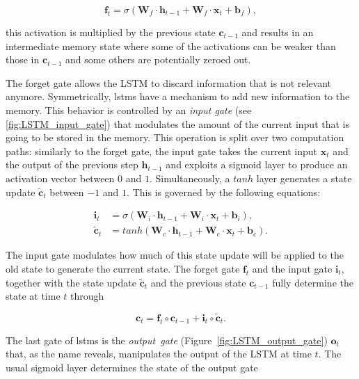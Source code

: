 \begin{equation}\label{eq:LSTM_forget_gate}
\mathbf{f}_t = \sigma\left(\mathbf{W}_f \cdot \mathbf{h}_{t-1} +
\mathbf{W}_f \cdot \mathbf{x}_t + \mathbf{b}_f \right),
\end{equation}

this activation is multiplied by the previous state $\mathbf{c}_{t-1}$ and results in an intermediate memory state where some of the activations can be weaker than those in $\mathbf{c}_{t-1}$ and some others are potentially zeroed out.

The forget gate allows the LSTM to discard information that is not relevant anymore. Symmetrically, \gls{lstm}s have a mechanism to add new information to the memory. This behavior is controlled by an \emph{input gate} (see
\ref{fig:LSTM_input_gate}) that modulates the amount of the current input that is going to be stored in the memory. This operation is split over two computation paths: similarly to the forget gate, the input gate takes the current input $\mathbf{x}_t$ and the output of the previous step $\mathbf{h}_{t-1}$ and exploits a sigmoid layer to produce an activation vector between $0$ and $1$. Simultaneously, a $tanh$ layer generates a state update $\mathbf{\tilde c}_t$ between $-1$ and $1$. This is governed by the following equations:

\begin{equation}\label{eq:LSTM_input_gate}
\begin{split}
\mathbf{i}_t &= \sigma\left(\mathbf{W}_i \cdot \mathbf{h}_{t-1} +
\mathbf{W}_i \cdot \mathbf{x}_t + \mathbf{b}_i \right),\\
\mathbf{\tilde c}_t &= tanh \left(\mathbf{W}_c \cdot
\mathbf{h}_{t-1} + \mathbf{W}_c \cdot \mathbf{x}_t +
\mathbf{b}_c \right).
\end{split}
\end{equation}

The input gate modulates how much of this state update will be applied to the old state to generate the current state. The forget gate $\mathbf{f}_t$ and the input gate $\mathbf{i}_t$, together with the state update $\mathbf{\tilde c}_t$ and the previous state $\mathbf{c}_{t-1}$ fully determine the state at time $t$ through

\begin{equation}\label{eq:LSTM_state_update}
\mathbf{c}_t = \mathbf{f}_t \circ \mathbf{c}_{t-1} +
\mathbf{i}_t \circ \mathbf{\tilde c}_t.
\end{equation}

The last gate of \gls{lstm}s is the \emph{output~gate} (Figure~\ref{fig:LSTM_output_gate}) $\mathbf{o}_t$ that, as the name reveals, manipulates the output of the LSTM at time $t$. The usual sigmoid layer determines the state of the output gate

